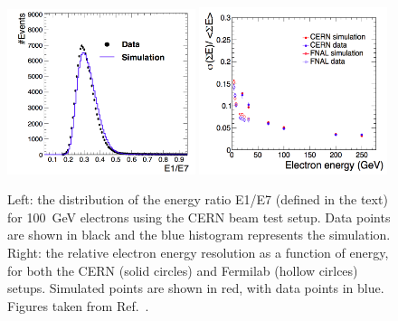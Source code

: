 \begin{figure}[h!]
  \centering
  \includegraphics[width=0.49\textwidth]{Figures/HGCAL/BeamTestShape.png}
  \includegraphics[width=0.49\textwidth]{Figures/HGCAL/BeamTestEnergy.png}
  \caption[Comparison of data and simulation in HGCAL beam tests.]
  {
    Left: the distribution of the energy ratio E1/E7 (defined in the text) for \SI{100}{GeV} electrons
    using the CERN beam test setup.
    Data points are shown in black and the blue histogram represents the simulation.
    Right: the relative electron energy resolution as a function of energy, 
    for both the CERN (solid circles) and Fermilab (hollow cirlces) setups.
    Simulated points are shown in red, with data points in blue.
    Figures taken from Ref.~\cite{HGCAL}.
  }
  \label{fig:hgcal_BeamTest}
\end{figure}

